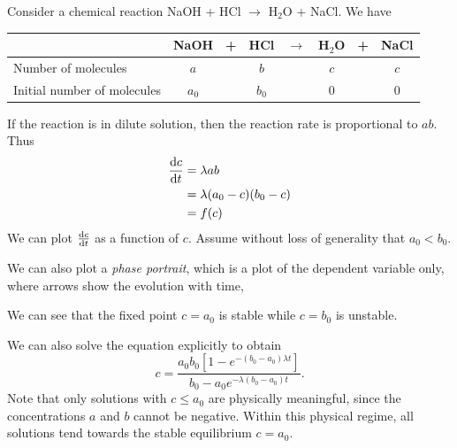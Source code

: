 \documentclass[a4paper]{article}
\begin{document}
\begin{eg}
  Consider a chemical reaction NaOH + HCl $\rightarrow$ H$_2$O + NaCl. We have
  \begin{center}
    \begin{tabular}{lccccccc}
      \toprule
      & NaOH & + & HCl & $\rightarrow$ & H$_2$O & + & NaCl \\
      \midrule
      Number of molecules & $a$ & & $b$ & & $c$ & & $c$ \\
      Initial number of molecules & $a_0$ & & $b_0$ & & $0$ & & $0$ \\
      \bottomrule
    \end{tabular}
  \end{center}
  If the reaction is in dilute solution, then the reaction rate is proportional to $ab$. Thus
  \begin{align*}
    \frac{\mathrm{d} c}{\mathrm{d} t} &= \lambda ab\\
    &= \lambda (a_0 - c)(b_0 - c)\\
    &= f(c)
  \end{align*}
  We can plot $\frac{\mathrm{d} c}{\mathrm{d} t}$ as a function of $c$. Assume without loss of generality that $a_0 < b_0$.
  \begin{center}
  \end{center}
  We can also plot a \emph{phase portrait}, which is a plot of the dependent variable only, where arrows show the evolution with time,
  \begin{center}
  \end{center}
  We can see that the fixed point $c = a_0$ is stable while $c = b_0$ is unstable.

  We can also solve the equation explicitly to obtain
  \[
    c = \frac{a_0b_0[1 - e^{-(b_0 - a_0)\lambda t}]}{b_0 - a_0e^{-\lambda(b_0-a_0)t}}.
  \]
  Note that only solutions with $c \leq a_0$ are physically meaningful, since the concentrations $a$ and $b$ cannot be negative. Within this physical regime, all solutions tend towards the stable equilibrium $c = a_0$.
\end{eg}
\end{document}
